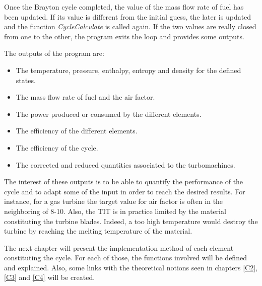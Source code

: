 Once the Brayton cycle completed, the value of the mass flow rate of fuel has been updated. If its value is different from the initial guess, the later is updated and the function \textit{CycleCalculate} is called again. If the two values are really closed from one to the other, the program exits the loop and provides some outputs.

The outputs of the program are:

\begin{itemize}
    \item The temperature, pressure, enthalpy, entropy and density for the defined states.
    \item The mass flow rate of fuel and the air factor.
    \item The power produced or consumed by the different elements.
    \item The efficiency of the different elements.
    \item The efficiency of the cycle.
    \item The corrected and reduced quantities associated to the turbomachines.
\end{itemize}

The interest of these outputs is to be able to quantify the performance of the cycle and to adapt some of the input in order to reach the desired results. For instance, for a gas turbine the target value for air factor is often in the neighboring of 8-10. Also, the TIT is in practice limited by the material constituting the turbine blades. Indeed, a too high temperature would destroy the turbine by reaching the melting temperature of the material.

The next chapter will present the implementation method of each element constituting the cycle. For each of those, the functions involved will be defined and explained. Also, some links with the theoretical notions seen in chapters \ref{C2}, \ref{C3} and \ref{C4} will be created.





 